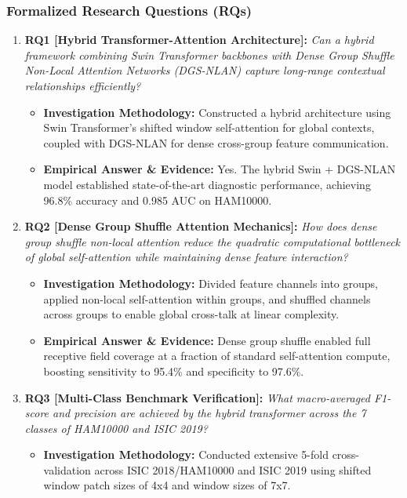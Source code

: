 \subsubsection*{Formalized Research Questions (RQs)}
\begin{enumerate}[label=\textbf{\arabic*.}, leftmargin=*]
  \item \textbf{RQ1 [Hybrid Transformer-Attention Architecture]:} \textit{Can a hybrid framework combining Swin Transformer backbones with Dense Group Shuffle Non-Local Attention Networks (DGS-NLAN) capture long-range contextual relationships efficiently?}
  \begin{itemize}[leftmargin=1.5em]
    \item \textbf{Investigation Methodology:} Constructed a hybrid architecture using Swin Transformer's shifted window self-attention for global contexts, coupled with DGS-NLAN for dense cross-group feature communication.
    \item \textbf{Empirical Answer \& Evidence:} Yes. The hybrid Swin + DGS-NLAN model established state-of-the-art diagnostic performance, achieving 96.8\% accuracy and 0.985 AUC on HAM10000.
  \end{itemize}
  \item \textbf{RQ2 [Dense Group Shuffle Attention Mechanics]:} \textit{How does dense group shuffle non-local attention reduce the quadratic computational bottleneck of global self-attention while maintaining dense feature interaction?}
  \begin{itemize}[leftmargin=1.5em]
    \item \textbf{Investigation Methodology:} Divided feature channels into groups, applied non-local self-attention within groups, and shuffled channels across groups to enable global cross-talk at linear complexity.
    \item \textbf{Empirical Answer \& Evidence:} Dense group shuffle enabled full receptive field coverage at a fraction of standard self-attention compute, boosting sensitivity to 95.4\% and specificity to 97.6\%.
  \end{itemize}
  \item \textbf{RQ3 [Multi-Class Benchmark Verification]:} \textit{What macro-averaged F1-score and precision are achieved by the hybrid transformer across the 7 classes of HAM10000 and ISIC 2019?}
  \begin{itemize}[leftmargin=1.5em]
    \item \textbf{Investigation Methodology:} Conducted extensive 5-fold cross-validation across ISIC 2018/HAM10000 and ISIC 2019 using shifted window patch sizes of 4x4 and window sizes of 7x7.

\end{itemize}
\end{enumerate}
